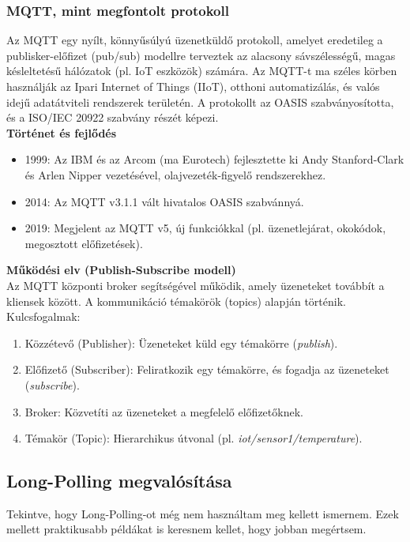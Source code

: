 \documentclass{thesis-ekf}
\theoremstyle{definition}
\theoremstyle{remark}
\begin{document}
	\subsubsection{MQTT, mint megfontolt protokoll}
	\label{sssec_MQQTT}
	Az MQTT egy nyílt, könnyűsúlyú üzenetküldő protokoll, amelyet eredetileg a publisker-előfizet (pub/sub) modellre terveztek az alacsony sávszélességű, magas késleltetésű hálózatok (pl. IoT eszközök) számára. Az MQTT-t ma széles körben használják az Ipari Internet of Things (IIoT), otthoni automatizálás, és valós idejű adatátviteli rendszerek területén. A protokollt az OASIS szabványosította, és a ISO/IEC 20922 szabvány részét képezi\cite{bib_MQTT_iso,bib_MQTT_oasis}.\\
	\textbf{Történet és fejlődés}
	\begin{itemize}
		\item 1999: Az IBM és az Arcom (ma Eurotech) fejlesztette ki Andy Stanford-Clark és Arlen Nipper vezetésével, olajvezeték-figyelő rendszerekhez\cite{bib_MQTT_ibm}.
		\item 2014: Az MQTT v3.1.1 vált hivatalos OASIS szabvánnyá.
		\item 2019: Megjelent az MQTT v5, új funkciókkal (pl. üzenetlejárat, okokódok, megosztott előfizetések).
	\end{itemize}
	\textbf{Működési elv (Publish-Subscribe modell)}\\
	Az MQTT központi broker segítségével működik, amely üzeneteket továbbít a kliensek között. A kommunikáció témakörök (topics) alapján történik.
	Kulcsfogalmak:
	\begin{enumerate}
		\item Közzétevő (Publisher): Üzeneteket küld egy témakörre (\textit{publish}).
		\item Előfizető (Subscriber): Feliratkozik egy témakörre, és fogadja az üzeneteket (\textit{subscribe}).
		\item Broker: Közvetíti az üzeneteket a megfelelő előfizetőknek.
		\item Témakör (Topic): Hierarchikus útvonal (pl. \textit{iot/sensor1/temperature}).
	\end{enumerate}
	\subsection{Long-Polling megvalósítása}
	\label{ssec_long_polling}
	Tekintve, hogy Long-Polling-ot még nem használtam meg kellett ismernem\cite{bib_long_poll1,bib_long_poll_imp}. Ezek mellett praktikusabb példákat is keresnem kellet, hogy jobban megértsem\cite{bib_long_poll_pl}.
	
\end{document}
